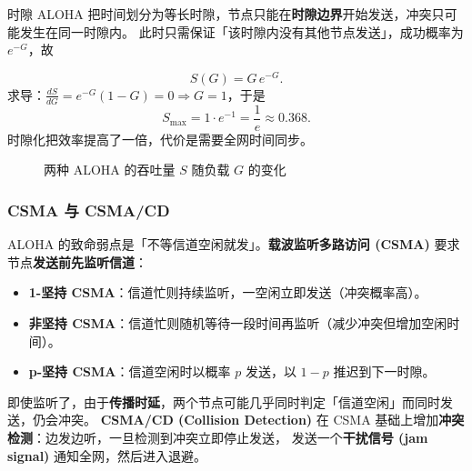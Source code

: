 时隙 ALOHA 把时间划分为等长时隙，节点只能在\textbf{时隙边界}开始发送，冲突只可能发生在同一时隙内。
此时只需保证「该时隙内没有其他节点发送」，成功概率为 $e^{-G}$，故

\begin{equation}
    S(G) = G\,e^{-G}.
\end{equation}
求导：$\frac{dS}{dG} = e^{-G}(1-G)=0 \Rightarrow G=1$，于是
\begin{equation}
    S_{\max} = 1\cdot e^{-1} = \frac{1}{e} \approx 0.368.
    \label{eq:aloha_slotted}
\end{equation}
时隙化把效率提高了一倍，代价是需要全网时间同步。

\begin{figure}[H]
\centering
{}
\caption{两种 ALOHA 的吞吐量 $S$ 随负载 $G$ 的变化}
\label{fig:aloha_curves}
\end{figure}

\subsubsection{CSMA 与 CSMA/CD}

ALOHA 的致命弱点是「不等信道空闲就发」。\textbf{载波监听多路访问 (CSMA)} 要求节点\textbf{发送前先监听信道}：
\begin{itemize}
    \item \textbf{1-坚持 CSMA}：信道忙则持续监听，一空闲立即发送（冲突概率高）。
    \item \textbf{非坚持 CSMA}：信道忙则随机等待一段时间再监听（减少冲突但增加空闲时间）。
    \item \textbf{p-坚持 CSMA}：信道空闲时以概率 $p$ 发送，以 $1-p$ 推迟到下一时隙。
\end{itemize}

即使监听了，由于\textbf{传播时延}，两个节点可能几乎同时判定「信道空闲」而同时发送，仍会冲突。
\textbf{CSMA/CD (Collision Detection)} 在 CSMA 基础上增加\textbf{冲突检测}：边发边听，一旦检测到冲突立即停止发送，
发送一个\textbf{干扰信号 (jam signal)} 通知全网，然后进入退避。


